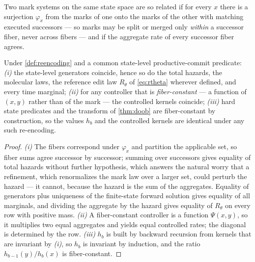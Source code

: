 \begin{definition}
\label{def:reencoding}
Two mark systems on the same state space are so related if for every $x$ there is a surjection $\varphi_x$ from the marks of one onto the marks of the other with matching executed successors --- so marks may be split or merged only \emph{within} a successor fiber, never across fibers --- and if the aggregate rate of every successor fiber agrees.
\end{definition}

\begin{proposition}
\label{prop:encoding}
Under \cref{def:reencoding} and a common state-level productive-commit predicate:
\emph{(i)} the state-level generators coincide, hence so do the total hazards, the molecular laws, the reference edit law $R_\theta$ of \eqref{eq:rtheta} wherever defined, and every time marginal;
\emph{(ii)} for any controller that is \emph{fiber-constant} --- a function of $(x,y)$ rather than of the mark --- the controlled kernels coincide;
\emph{(iii)} hard state predicates and the transform of \cref{thm:doob} are fiber-constant by construction, so the values $h_b$ and the controlled kernels are identical under any such re-encoding.
\end{proposition}

\begin{proof}[Proof]
\emph{(i)} The fibers correspond under $\varphi_x$ and partition the applicable set, so fiber sums agree successor by successor; summing over successors gives equality of total hazards without further hypothesis, which answers the natural worry that a refinement, which renormalizes the mark law over a larger set, could perturb the hazard --- it cannot, because the hazard is the sum of the aggregates. Equality of generators plus uniqueness of the finite-state forward solution gives equality of all marginals, and dividing the aggregate by the hazard gives equality of $R_\theta$ on every row with positive mass.
\emph{(ii)} A fiber-constant controller is a function $\Psi(x,y)$, so it multiplies two equal aggregates and yields equal controlled rates; the diagonal is determined by the row.
\emph{(iii)} $h_b$ is built by backward recursion from kernels that are invariant by \emph{(i)}, so $h_b$ is invariant by induction, and the ratio $h_{b-1}(y)/h_b(x)$ is fiber-constant.
\end{proof}

